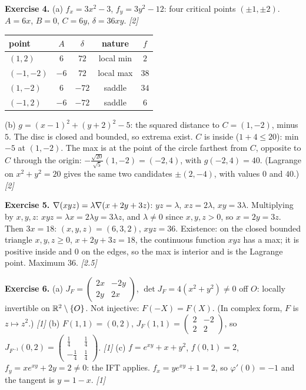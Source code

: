 \textbf{Exercise 4.}
(a) $f_x=3x^2-3$, $f_y=3y^2-12$: four critical points $(\pm1,\pm2)$. $A=6x$, $B=0$, $C=6y$,
$\delta=36xy$. \hfill\emph{[2]}
\begin{center}\small
\begin{tabular}{@{}lcccc@{}}\toprule
point & $A$ & $\delta$ & nature & $f$\\ \midrule
$(1,2)$ & $6$ & $72$ & local min & $2$\\
$(-1,-2)$ & $-6$ & $72$ & local max & $38$\\
$(1,-2)$ & $6$ & $-72$ & saddle & $34$\\
$(-1,2)$ & $-6$ & $-72$ & saddle & $6$\\ \bottomrule
\end{tabular}
\end{center}
(b) $g=(x-1)^2+(y+2)^2-5$: the squared distance to $C=(1,-2)$, minus $5$. The disc is closed and
bounded, so extrema exist. $C$ is inside ($1+4\le20$): min $-5$ at $(1,-2)$. The max is at the
point of the circle farthest from $C$, opposite to $C$ through the origin:
$-\frac{\sqrt{20}}{\sqrt5}(1,-2)=(-2,4)$, with $g(-2,4)=40$. (Lagrange on $x^2+y^2=20$ gives the
same two candidates $\pm(2,-4)$, with values $0$ and $40$.) \hfill\emph{[2]}

\textbf{Exercise 5.}
$\nabla(xyz)=\lambda\nabla(x+2y+3z)$: $yz=\lambda$, $xz=2\lambda$, $xy=3\lambda$. Multiplying by $x,y,z$:
$xyz=\lambda x=2\lambda y=3\lambda z$, and $\lambda\ne0$ since $x,y,z>0$, so $x=2y=3z$. Then $3x=18$:
$(x,y,z)=(6,3,2)$, $xyz=36$. Existence: on the closed bounded triangle $x,y,z\ge0$, $x+2y+3z=18$,
the continuous function $xyz$ has a max; it is positive inside and $0$ on the edges, so the
max is interior and is the Lagrange point. Maximum $36$. \hfill\emph{[2.5]}

\textbf{Exercise 6.}
(a) $J_F=\begin{pmatrix}2x&-2y\\2y&2x\end{pmatrix}$, $\det J_F=4(x^2+y^2)\ne0$ off $O$: locally invertible
on $\mathbb{R}^2\setminus\{O\}$. Not injective: $F(-X)=F(X)$. (In complex form, $F$ is $z\mapsto z^2$.) \hfill\emph{[1]}
(b) $F(1,1)=(0,2)$, $J_F(1,1)=\begin{pmatrix}2&-2\\2&2\end{pmatrix}$, so
$J_{F^{-1}}(0,2)=\begin{pmatrix}\frac14&\frac14\\-\frac14&\frac14\end{pmatrix}$. \hfill\emph{[1]}
(c) $f=e^{xy}+x+y^2$, $f(0,1)=2$, $f_y=xe^{xy}+2y=2\ne0$: the IFT applies. $f_x=ye^{xy}+1=2$, so
$\varphi'(0)=-1$ and the tangent is $y=1-x$. \hfill\emph{[1]}

